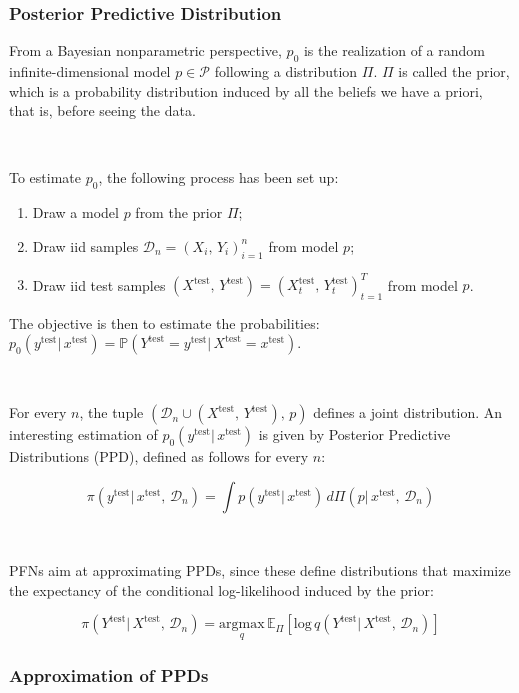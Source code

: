 \documentclass{article}
\begin{document}
\subsubsection{Posterior Predictive Distribution}

From a Bayesian nonparametric perspective, $p_0$ is the realization of a random infinite-dimensional model $p \in \mathcal{P}$ following a distribution $\Pi$. $\Pi$ is called the prior, which is a probability distribution induced by all the beliefs we have a priori, that is, before seeing the data.

~

To estimate $p_0$, the following process has been set up:

\begin{enumerate}[label=\roman*]
    \item Draw a model $p$ from the prior $\Pi$;
    \item Draw iid samples $\mathcal{D}_n = (X_i,\, Y_i)_{i=1}^n$ from model $p$;
    \item Draw iid test samples $(X^{\text{test}}, \,  Y^{\text{test}}) = (X_t^{\text{test}}, \,  Y_t^{\text{test}})_{t=1}^T$ from model $p$.
\end{enumerate}

The objective is then to estimate the probabilities: $p_0(y^{\text{test}}|\, x^{\text{test}}) = \mathbb{P}(Y^{\text{test}} = y^{\text{test}}|\, X^{\text{test}} = x^{\text{test}})$.

~

For every $n$, the tuple $(\mathcal{D}_n \cup (X^{\text{test}}, \,  Y^{\text{test}}),\, p)$ defines a joint distribution. An interesting estimation of $p_0(y^{\text{test}}|\, x^{\text{test}})$ is given by Posterior Predictive Distributions (PPD), defined as follows for every $n$:

$$\pi(y^{\text{test}}|\, x^{\text{test}}, \, \mathcal{D}_n) = \int p(y^{\text{test}}|\, x^{\text{test}})\, d\Pi(p|\, x^{\text{test}},\, \mathcal{D}_n)$$

~

PFNs aim at approximating PPDs, since these define distributions that maximize the expectancy of the conditional log-likelihood induced by the prior:

$$\pi(Y^{\text{test}}|\, X^{\text{test}}, \, \mathcal{D}_n) = \underset{q}{\text{argmax}}\, \mathbb{E}_{\Pi}[ \text{log}\, q(Y^{\text{test}}|\, X^{\text{test}}, \, \mathcal{D}_n)]$$

\subsubsection{Approximation of PPDs}
\end{document}
